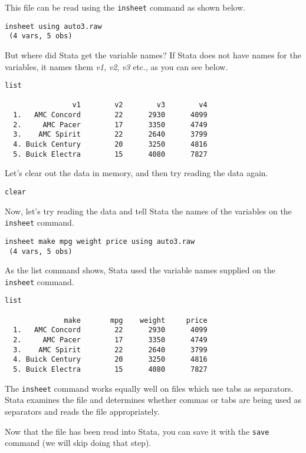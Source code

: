 This file can be read using the \lstinline{insheet} command as shown below.

\begin{lstlisting}
insheet using auto3.raw
 (4 vars, 5 obs)
\end{lstlisting}

But where did Stata get the variable names? If Stata does not have names for the variables, it names them \textit{v1}, \textit{v2}, \textit{v3} etc., as you can see below.

\begin{lstlisting}
list

                v1        v2        v3        v4
  1.   AMC Concord        22      2930      4099
  2.     AMC Pacer        17      3350      4749
  3.    AMC Spirit        22      2640      3799
  4. Buick Century        20      3250      4816
  5. Buick Electra        15      4080      7827
\end{lstlisting}

Let's clear out the data in memory, and then try reading the data again.

\begin{lstlisting}
clear
\end{lstlisting}

Now, let's try reading the data and tell Stata the names of the variables on the \lstinline{insheet} command.

\begin{lstlisting}
insheet make mpg weight price using auto3.raw
 (4 vars, 5 obs)
\end{lstlisting}

As the list command shows, Stata used the variable names supplied on the \lstinline{insheet} command.

\begin{lstlisting}
list

              make       mpg    weight     price
  1.   AMC Concord        22      2930      4099
  2.     AMC Pacer        17      3350      4749
  3.    AMC Spirit        22      2640      3799
  4. Buick Century        20      3250      4816
  5. Buick Electra        15      4080      7827
\end{lstlisting}

The \lstinline{insheet} command works equally well on files which use tabs as separators. Stata examines the file and determines whether commas or tabs are being used as separators and reads the file appropriately.

Now that the file has been read into Stata, you can save it with the \lstinline{save} command (we will skip doing that step).


